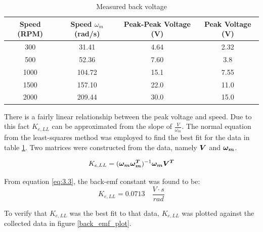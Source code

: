 \begin{table}[ht]
\begin{center}
\caption{Measured back voltage }
\begin{tabular}[c]{|c|c|c|c|}

\hline
\textbf{Speed (RPM)} & \textbf{Speed \(\omega_m\) (rad/s)} & \textbf{Peak-Peak Voltage (V)} & \textbf{Peak Voltage (V)}\\

\hline
300  & 31.41  & 4.64 & 2.32\\

\hline
500 & 52.36 & 7.60 & 3.8\\

\hline
1000 & 104.72 & 15.1 & 7.55\\

\hline
1500 & 157.10 & 22.0 & 11.0\\

\hline
2000 & 209.44 & 30.0 & 15.0\\

\hline
\end{tabular}

\label{table3}
\end{center}
\end{table}

There is a fairly linear relationship between the peak voltage and speed. Due to this fact \(K_{e,LL}\) can be approximated from the slope of \(\frac{V}{\omega_m}\). The normal equation from the least-squares method was employed to find the best fit for the data in table \ref{table3}. Two matrices were constructed from the data, namely \(\bm{V}\) and \(\bm{\omega_m}\).

\begin{equation} \label{eq:3.3}
K_{e,LL} = (\bm{\omega_m \omega_m^T})^{-1} \bm{\omega_m V^T}
\end{equation} 

From equation \ref{eq:3.3}, the back-emf constant was found to be: 
\[K_{e,LL} = 0.0713 \quad \frac{V \cdot s}{rad} \]

To verify that \(K_{e,LL}\) was the best fit to that data, \(K_{e,LL}\) was plotted against the collected data in figure \ref{back_emf_plot}.

